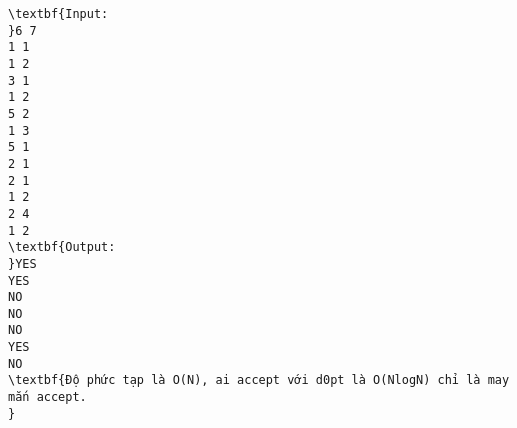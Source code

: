 \begin{verbatim}
\textbf{Input:
}6 7
1 1
1 2
3 1
1 2
5 2
1 3
5 1
2 1
2 1
1 2
2 4
1 2
\textbf{Output: 
}YES
YES
NO
NO
NO
YES
NO
\textbf{Độ phức tạp là O(N), ai accept với d0pt là O(NlogN) chỉ là may mắn accept.
}\end{verbatim}